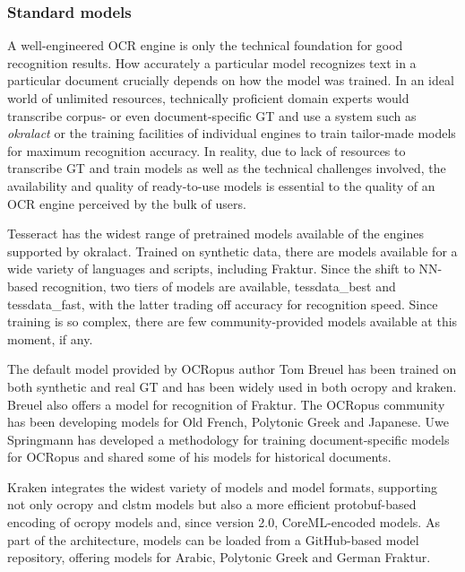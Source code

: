 \documentclass[conference]{IEEEtran}
\begin{document}
\subsubsection{Standard models}

A well-engineered OCR engine is only the technical foundation for
good recognition results. How accurately a particular model recognizes text
in a particular document crucially depends on how the model was trained. In
an ideal world of unlimited resources, technically proficient domain experts
would transcribe corpus- or even document-specific GT and use a system such as
\textit{okralact} or the training facilities of individual engines to train
tailor-made models for maximum recognition accuracy. In reality, due to lack of
resources to transcribe GT and train models as well as the technical
challenges involved, the availability and quality of ready-to-use models is 
essential to the quality of an OCR engine perceived by the bulk of users.

Tesseract has the widest range of pretrained models available of the engines
supported by okralact. Trained on synthetic data, there are models available
for a wide variety of languages and scripts, including Fraktur. Since the shift
to NN-based recognition, two tiers of models are available, tessdata\_best and
tessdata\_fast, with the latter trading off accuracy for recognition speed. Since
training is so complex, there are few community-provided models available at this
moment, if any.


The default model provided by OCRopus author Tom Breuel has been trained on
both synthetic and real GT and has been widely used in both ocropy and kraken.
Breuel also offers a model for recognition of Fraktur. The OCRopus community
has been developing models for Old French, Polytonic Greek and Japanese. Uwe
Springmann has developed a methodology for training document-specific models
for OCRopus and shared some of his models for historical documents.

Kraken integrates the widest variety of models and model formats,
supporting not only ocropy and clstm models but also a more efficient
protobuf-based encoding of ocropy models and, since version 2.0, CoreML-encoded
models. As part of the architecture, models can be loaded from a GitHub-based
model repository, offering models for Arabic, Polytonic Greek and German Fraktur.

\end{document}
